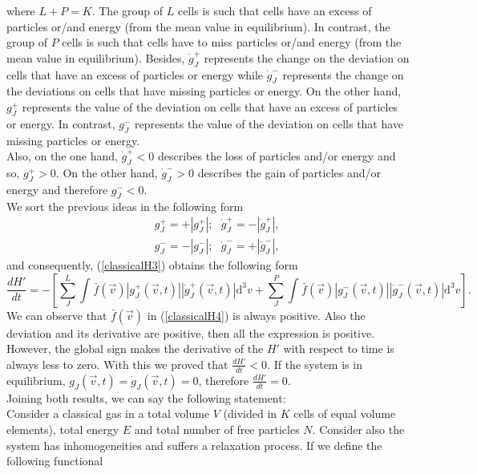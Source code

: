 \documentclass{article}
\begin{document}
where $L+P=K$. The group of $L$ cells is such that cells have an excess of particles or/and energy (from the mean value in equilibrium). In contrast, the group of $P$ cells is such that cells have to miss particles or/and energy (from the mean value in equilibrium). Besides, $\dot{g}^{+}_{J}$ represents the change on the deviation on cells that have an excess of particles or energy while $\dot{g}^{-}_{J}$  represents the change on the deviations on cells that have missing particles or energy. 
On the other hand, $g^{+}_{J}$  represents the value of the deviation on cells that have an excess of particles or energy. In contrast, $g^{-}_{J}$ represents the value of the deviation on cells that have missing particles or energy.\\
Also, on the one hand, $\dot{g}^{+}_{J}<0$ describes the loss of particles and/or energy and so, $g^{+}_{J}>0$. On the other hand, $\dot{g}^{-}_{J}>0$ describes the gain of particles and/or energy and therefore $g^{-}_{J}<0$. \\
We sort the previous ideas in the following form
\begin{eqnarray}
   &&g^{+}_{J}=+|g^{+}_{J}|; \ \ \  \dot{g}^{+}_{J}=-|\dot{g}^{+}_{J}|, \nonumber \\
   &&g^{-}_{J}=-|g^{-}_{J}|; \ \ \ \dot{g}^{-}_{J}=+|\dot{g}^{-}_{J}| \label{separacionclassical},
\end{eqnarray}
and consequently, (\ref{classicalH3}) obtains the following form
\begin{equation}
    \frac{dH'}{dt}=-\left[
                               \sum_J^{L}\int_{}^{}\bar f(\vec{v})|g_J^{+}(\vec{v},t)||\dot g_J^{+}(\vec{v},t)|\mathrm{d}^3v +\sum_J^{P}\int_{}^{}\bar f(\vec{v})|g_J^{-}(\vec{v},t)||\dot g_J^{-}(\vec{v},t)|\mathrm{d}^3v 
    \right]. \label{classicalH4}
\end{equation}
We can observe that $\bar{f}(\vec{v})$ in (\ref{classicalH4}) is always positive. Also the deviation and its derivative are positive, then all the expression is positive. However, the global sign makes the derivative of the $H'$ with respect to time is always less to zero. With this we proved that $\frac{dH'}{dt}<0$. If the system is in equilibrium, $g_{J}(\vec{v},t)=\dot g_J(\vec{v},t)=0$, therefore $\frac{dH'}{dt}=0$.\\
Joining both results, we can say the following statement:\\
Consider a classical gas in a total volume $V$ (divided in $K$ cells of equal volume elements), total energy $E$ and total number of free particles $N$. Consider also the system has inhomogeneities and suffers a relaxation process. If we define the following functional
\end{document}
